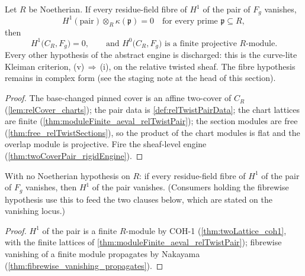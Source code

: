 \begin{theorem}
  \label{thm:relTwistRigidEngine}
  \leanok
  Let \(R\) be Noetherian. If every residue-field fibre of \(H^1\) of the pair of
  \(F_g\) vanishes,
  \[
    H^1(\text{pair}) \otimes_R \kappa(\mathfrak p) = 0 \quad \text{for every prime }
      \mathfrak p \subseteq R,
  \]
  then
  \[
    H^1\bigl(C_R, F_g\bigr) = 0, \qquad \text{and } H^0\bigl(C_R, F_g\bigr)
      \text{ is a finite projective } R\text{-module}.
  \]
  Every other hypothesis of the abstract engine is discharged: this is the curve-lite
  Kleiman criterion, (v)\,\(\Rightarrow\)\,(i), on the relative twisted sheaf. The
  fibre hypothesis remains in complex form (see the staging note at the head of this
  section).
\end{theorem}
\begin{proof}
  \leanok
  The base-changed pinned cover is an affine two-cover of \(C_R\)
  (\ref{lem:relCover_charts}); the pair data is \ref{def:relTwistPairData}; the chart
  lattices are finite (\ref{thm:moduleFinite_aeval_relTwistPair}); the section modules
  are free (\ref{thm:free_relTwistSections}), so the product of the chart modules is
  flat and the overlap module is projective. Fire the sheaf-level engine
  (\ref{thm:twoCoverPair_rigidEngine}).
\end{proof}

\begin{lemma}
  \label{lem:relTwist_subsingleton_pairH1}
  \leanok
  With no Noetherian hypothesis on \(R\): if every residue-field fibre of \(H^1\) of
  the pair of \(F_g\) vanishes, then \(H^1\) of the pair vanishes. (Consumers holding
  the fibrewise hypothesis use this to feed the two clauses below, which are stated on
  the vanishing locus.)
\end{lemma}
\begin{proof}
  \leanok
  \(H^1\) of the pair is a finite \(R\)-module by COH-1
  (\ref{thm:twoLattice_coh1}, with the finite lattices of
  \ref{thm:moduleFinite_aeval_relTwistPair}); fibrewise vanishing of a finite module
  propagates by Nakayama (\ref{thm:fibrewise_vanishing_propagates}).
\end{proof}

